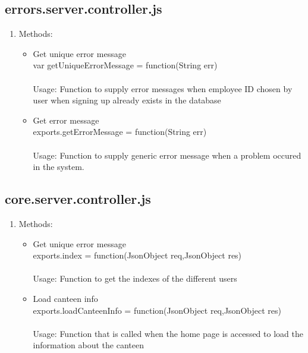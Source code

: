 \documentclass[a4paper,12pt]{article}
\begin{document}
\subsection{errors.server.controller.js}
\begin{enumerate}
	\item Methods:
	\begin{itemize}
		\item Get unique error message \\ var getUniqueErrorMessage = function(String err) \\ \\
		Usage: Function to supply error messages when employee ID chosen by user when signing up already exists in the database
		\item Get error message \\ exports.getErrorMessage = function(String err) 
		\\ \\ Usage: Function to supply generic error message when a problem occured in the system.
	\end{itemize}
\end{enumerate}

\subsection{core.server.controller.js}
\begin{enumerate}
	\item Methods:
	\begin{itemize}
		\item Get unique error message \\ exports.index = function(JsonObject req,JsonObject  res) 
		\\ \\ Usage: Function to get the indexes of the different users 
		\item Load canteen info \\ exports.loadCanteenInfo = function(JsonObject req,JsonObject  res)
		\\ \\ Usage: Function that is called when the home page is accessed to load the information about the canteen
	\end{itemize}
\end{enumerate}
\end{document}
